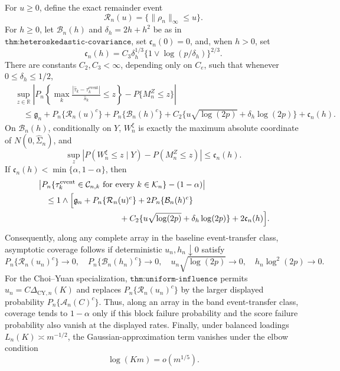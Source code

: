 For \(u\ge0\), define the exact remainder event
\[
 \mathcal R_n(u)=\{\|\rho_n\|_\infty\le u\}.
\]
For \(h\ge0\), let \(\mathcal B_n(h)\) and
\(\delta_h=2h+h^2\) be as in
\(\texttt{thm:heteroskedastic-covariance}\), set
\(\mathfrak c_n(0)=0\), and, when \(h>0\), set
\[
 \mathfrak c_n(h)=C_3\delta_h^{1/3}
 \{1\vee\log(p/\delta_h)\}^{2/3}.
\]
There are constants \(C_2,C_3<\infty\), depending only on \(C_e\),
such that whenever \(0\le\delta_h\le1/2\),
\[
 \begin{aligned}
 &\sup_{z\in\mathbb R}\left|P_n\!\left\{
 \max_k\frac{|\widehat\tau_k-\tau_k^{\mathrm{event}}|}{\widehat s_k}
 \le z\right\}-P\{M_n^Z\le z\}\right|\\
 &\quad\le \mathfrak g_n+P_n\{\mathcal R_n(u)^c\}
 +P_n\{\mathcal B_n(h)^c\}
 +C_2\{u\sqrt{\log(2p)}+\delta_h\log(2p)\}
 +\mathfrak c_n(h).
 \end{aligned}
\]
On \(\mathcal B_n(h)\), conditionally on \(Y\), \(W_n^\xi\) is
exactly the maximum absolute coordinate of
\(N(0,\widehat\Sigma_n)\), and
\[
 \sup_z|P(W_n^\xi\le z\mid Y)-P(M_n^Z\le z)|
 \le\mathfrak c_n(h).
\]
If \(\mathfrak c_n(h)<\min\{\alpha,1-\alpha\}\), then
\[
 \begin{aligned}
 &\left|P_n\{\tau_k^{\mathrm{event}}\in\mathcal C_{n,k}
 \text{ for every }k\in\mathcal K_n\}-(1-\alpha)\right|\\
 &\quad\le1\wedge\Big[\mathfrak g_n
 +P_n\{\mathcal R_n(u)^c\}+2P_n\{\mathcal B_n(h)^c\}\\
 &\hspace{35mm}+C_2\{u\sqrt{\log(2p)}+\delta_h\log(2p)\}
 +2\mathfrak c_n(h)\Big].
 \end{aligned}
\]
Consequently, along any complete array in the baseline event-transfer
class, asymptotic coverage follows if deterministic \(u_n,h_n\downarrow0\)
satisfy
\[
 P_n\{\mathcal R_n(u_n)^c\}\to0,
 \quad P_n\{\mathcal B_n(h_n)^c\}\to0,
 \quad u_n\sqrt{\log(2p)}\to0,
 \quad h_n\log^2(2p)\to0.
\]
For the Choi--Yuan specialization,
\(\texttt{thm:uniform-influence}\) permits
\(u_n=C\Delta_{\mathrm{CY},n}(K)\) and replaces
\(P_n\{\mathcal R_n(u_n)^c\}\) by the larger displayed probability
\(P_n\{\mathcal A_n(C)^c\}\).  Thus, along an array in the band
event-transfer class, coverage tends to \(1-\alpha\) only if this block
failure probability and the score failure probability also vanish at the
displayed rates.  Finally, under balanced loadings
\(L_n(K)\asymp m^{-1/2}\), the Gaussian-approximation term vanishes under
the elbow condition
\[
 \log(Km)=o(m^{1/5}).
\]

